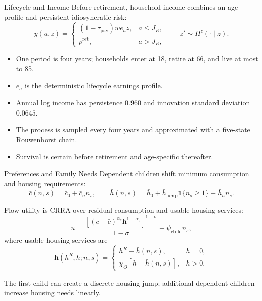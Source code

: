 \documentclass[aspectratio=169,11pt]{beamer}
\newcommand{\1}{\mathbf 1}
\begin{document}
\begin{frame}{Lifecycle and Income}
  \small
  Before retirement, household income combines an age profile and persistent idiosyncratic risk:
  \[
    y(a,z)=
    \begin{cases}
      (1-\tau_{\mathrm{pay}})we_a z, & a\le J_R,\\
      p^{\mathrm{ret}}, & a>J_R,
    \end{cases}
    \qquad
    z'\sim\Pi^z(\cdot\mid z).
  \]

  \begin{itemize}\setlength{\itemsep}{0.35em}
    \item One period is four years; households enter at 18, retire at 66, and live at most to 85.
    \item $e_a$ is the deterministic lifecycle earnings profile.
    \item Annual log income has persistence $0.960$ and innovation standard deviation $0.0645$.
    \item The process is sampled every four years and approximated with a five-state Rouwenhorst chain.
    \item Survival is certain before retirement and age-specific thereafter.
  \end{itemize}
\end{frame}

\begin{frame}{Preferences and Family Needs}
  Dependent children shift minimum consumption and housing requirements:
  \[
    \bar c(n,s)=\bar c_0+\bar c_n n_s,
    \qquad
    \bar h(n,s)=\bar h_0+\bar h_{\mathrm{jump}}\1\{n_s\ge1\}+\bar h_n n_s.
  \]

  Flow utility is CRRA over residual consumption and usable housing services:
  \[
    u=\frac{\left[(c-\bar c)^{\alpha_c}\mathbf h^{1-\alpha_c}\right]^{1-\sigma}}{1-\sigma}
      +\psi_{\mathrm{child}}n_s,
  \]
  where usable housing services are
  \[
    \mathbf h(h^R,h;n,s)=
    \begin{cases}
      h^R-\bar h(n,s), & h=0,\\
      \chi_O[h-\bar h(n,s)], & h>0.
    \end{cases}
  \]

  The first child can create a discrete housing jump; additional dependent children increase housing needs linearly.
\end{frame}
\end{document}
